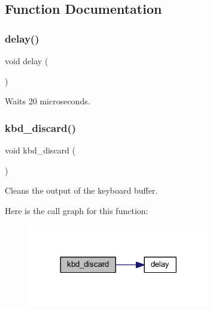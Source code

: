 \subsection{Function Documentation}
\mbox{\label{group___keyboard_gabb9ee10191569258e0f22bdd0a95ba62}} 
\subsubsection{\texorpdfstring{delay()}{delay()}}
{\footnotesize\ttfamily void delay (\begin{DoxyParamCaption}{ }\end{DoxyParamCaption})}



Waits 20 microseconds. 

\mbox{\label{group___keyboard_gaa446b75f68daaa0d8af27bad682c3c45}} 
\subsubsection{\texorpdfstring{kbd\+\_\+discard()}{kbd\_discard()}}
{\footnotesize\ttfamily void kbd\+\_\+discard (\begin{DoxyParamCaption}{ }\end{DoxyParamCaption})}



Cleans the output of the keyboard buffer. 

Here is the call graph for this function\+:
\nopagebreak
\begin{figure}[H]
\begin{center}
\leavevmode
\includegraphics[width=225pt]{group___keyboard_gaa446b75f68daaa0d8af27bad682c3c45_cgraph}
\end{center}
\end{figure}
\mbox{\label{group___keyboard_gafba3a35bd6a79305e84ab4f33a5ffa7f}} 
